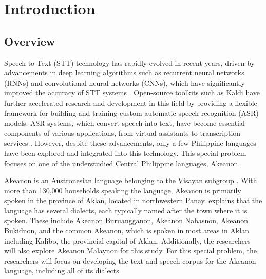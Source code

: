 \chapter{Introduction}
\label{sec:researchdesc}    %

\section{Overview}
\label{sec:overview}

Speech-to-Text (STT) technology has rapidly evolved in recent years, driven by advancements in deep learning algorithms such as recurrent neural networks (RNNs) and convolutional neural networks (CNNs), which have significantly improved the accuracy of STT systems \cite{Televic:2024}. Open-source toolkits such as Kaldi have further accelerated research and development in this field by providing a flexible framework for building and training custom automatic speech recognition (ASR) models. ASR systems, which convert speech into text, have become essential components of various applications, from virtual assistants to transcription services . However, despite these advancements, only a few Philippine languages have been explored and integrated into this technology. This special problem focuses on one of the understudied \cite{Wellstood:2022} Central Philippine languages, Akeanon. 

Akeanon is an Austronesian language belonging to the Visayan subgroup \cite{Biray:2023}. With more than 130,000 households \cite{PSA:2023} speaking the language, Akeanon is primarily spoken in the province of Aklan, located in northwestern Panay.  explains that the language has several dialects, each typically named after the town where it is spoken. These include Akeanon Buruangganon, Akeanon Nabasnon, Akeanon Bukidnon, and the common Akeanon, which is spoken in most areas in Aklan including Kalibo, the provincial capital of Aklan. Additionally, the researchers will also explore Akeanon Malaynon for this study. For this special problem, the researchers will focus on developing the text and speech corpus for the Akeanon language, including all of its dialects.


